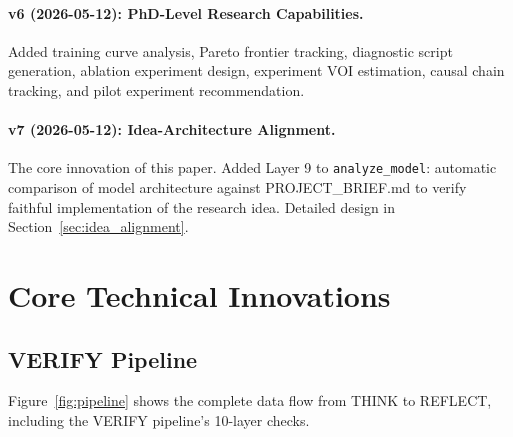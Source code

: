 \documentclass[11pt,a4paper]{article}
\newcommand{\toolname}[1]{\texttt{#1}}
\begin{document}
\paragraph{v6 (2026-05-12): PhD-Level Research Capabilities.}
Added training curve analysis, Pareto frontier tracking, diagnostic script generation, ablation experiment design, experiment VOI estimation, causal chain tracking, and pilot experiment recommendation.

\paragraph{v7 (2026-05-12): Idea-Architecture Alignment.}
The core innovation of this paper. Added Layer 9 to \toolname{analyze\_model}: automatic comparison of model architecture against PROJECT\_BRIEF.md to verify faithful implementation of the research idea. Detailed design in Section~\ref{sec:idea_alignment}.


\section{Core Technical Innovations}

\subsection{VERIFY Pipeline}

Figure~\ref{fig:pipeline} shows the complete data flow from THINK to REFLECT, including the VERIFY pipeline's 10-layer checks.
\end{document}
